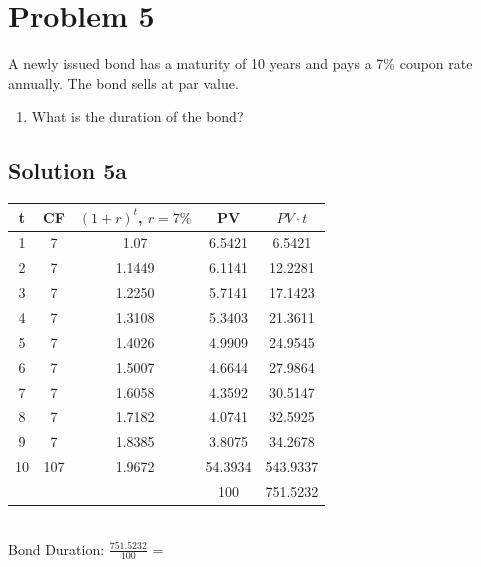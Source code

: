 \documentclass[12]{article}
\begin{document}
\color{black}
\section*{Problem 5}
A newly issued bond has a maturity of 10 years and pays a 7\% coupon rate annually. The bond sells at par value.
\begin{enumerate}
    \item[a)] What is the duration of the bond?
\end{enumerate}

\color{blue}
\subsection*{Solution 5a}

\begin{table}[H]
    \centering
    {\color{blue}\begin{tabular}{ccccc}
    \toprule
        t & CF & $(1+r)^t$, $r=7\%$  & PV & $PV\cdot t$\\\midrule
        1 & 7 & 1.07 & 6.5421 & 6.5421 \\ 
        2 & 7 & 1.1449 & 6.1141 & 12.2281\\
        3 & 7 & 1.2250 & 5.7141 & 17.1423\\
        4 & 7 & 1.3108 & 5.3403 & 21.3611 \\
        5 & 7 & 1.4026 & 4.9909 & 24.9545\\
        6 & 7 & 1.5007 & 4.6644 & 27.9864\\
        7 & 7 & 1.6058 & 4.3592 & 30.5147\\
        8 & 7 & 1.7182 & 4.0741 & 32.5925\\
        9 & 7 & 1.8385 & 3.8075 & 34.2678\\
        10 & 107 & 1.9672 & 54.3934 & 543.9337 \\\midrule
           &     &         & 100 & 751.5232\\\bottomrule
    \end{tabular}}
    \label{tab:my_label}
\end{table}

\noindent
\\
Bond Duration: {\Large $\frac{751.5232}{100}$} = 
\end{document}
